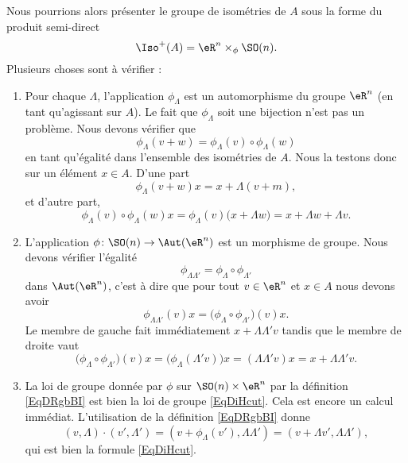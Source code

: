 Nous pourrions alors présenter le groupe de isométries de \( A\) sous la forme du produit semi-direct
\begin{equation}
    \Iso^+(A)=\eR^n\times_{\phi}\SO(n).
\end{equation}
Plusieurs choses sont à vérifier :
\begin{enumerate}
    \item
        Pour chaque \( \Lambda\), l'application \( \phi_{\Lambda}\) est un automorphisme du groupe \( \eR^n\) (en tant qu'agissant sur \( A\)). Le fait que \( \phi_{\Lambda}\) soit une bijection n'est pas un problème. Nous devons vérifier que
        \begin{equation}
            \phi_{\Lambda}(v+w)=\phi_{\Lambda}(v)\circ\phi_{\Lambda}(w)
        \end{equation}
        en tant qu'égalité dans l'ensemble des isométries de \( A\). Nous la testons donc sur un élément \( x\in A\). D'une part
        \begin{equation}
            \phi_{\Lambda}(v+w)x=x+\Lambda(v+m),
        \end{equation}
        et d'autre part,
        \begin{equation}
            \phi_{\Lambda}(v)\circ\phi_{\Lambda}(w)x=\phi_{\Lambda}(v)\big( x+\Lambda w \big)=x+\Lambda w+\Lambda v.
        \end{equation}
    \item
        L'application \( \phi\colon \SO(n)\to \Aut(\eR^n)\) est un morphisme de groupe. Nous devons vérifier l'égalité
        \begin{equation}
            \phi_{\Lambda\Lambda'}=\phi_{\Lambda}\circ\phi_{\Lambda'}
        \end{equation}
        dans \( \Aut(\eR^n)\), c'est à dire que pour tout \( v\in \eR^n\) et \( x\in A\) nous devons avoir
        \begin{equation}
            \phi_{\Lambda\Lambda'}(v)x=\big( \phi_{\Lambda}\circ\phi_{\Lambda'}\big)(v)x.
        \end{equation}
        Le membre de gauche fait immédiatement \( x+\Lambda\Lambda'v\) tandis que le membre de droite vaut
        \begin{equation}
            \big( \phi_{\Lambda}\circ\phi_{\Lambda'}\big)(v)x=\big( \phi_{\Lambda}(\Lambda'v) \big)x=(\Lambda\Lambda'v)x=x+\Lambda\Lambda'v.
        \end{equation}
    \item
        La loi de groupe donnée par \( \phi\) sur \( \SO(n)\times \eR^n\) par la définition \eqref{EqDRgbBI} est bien la loi de groupe \eqref{EqDiHcut}. Cela est encore un calcul immédiat. L'utilisation de la définition \eqref{EqDRgbBI} donne
        \begin{equation}
            (v,\Lambda)\cdot(v',\Lambda')=(v+\phi_{\Lambda}(v'),\Lambda\Lambda')=(v+\Lambda v',\Lambda\Lambda'),
        \end{equation}
        qui est bien la formule \eqref{EqDiHcut}.
\end{enumerate}

